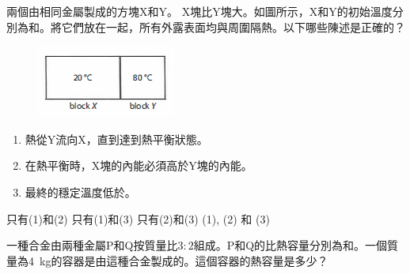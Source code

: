 {
    兩個由相同金屬製成的方塊X和Y。 X塊比Y塊大。如圖所示，X和Y的初始溫度分別為和。將它們放在一起，所有外露表面均與周圍隔熱。以下哪些陳述是正確的？
    \begin{figure}[h]
        \centering
        \includegraphics[width=0.35\linewidth]{assets/Screenshot 2023-08-29 143228.png}
    \end{figure}
    \begin{enumerate}[label=\sd]
        \item 熱從Y流向X，直到達到熱平衡狀態。
        \item 在熱平衡時，X塊的內能必須高於Y塊的內能。
        \item 最終的穩定溫度低於。
    \end{enumerate}
    \begin{choices}
        \choice 只有(1)和(2)
        \choice 只有(1)和(3)
        \choice 只有(2)和(3)
        \CorrectChoice (1), (2) 和 (3)
    \end{choices}
}{}

{
    一種合金由兩種金屬P和Q按質量比$3:2$組成。P和Q的比熱容量分別為和。一個質量為\qty{4}{kg}的容器是由這種合金製成的。這個容器的熱容量是多少？
    \begin{choices}
        \choice {}
        \choice {}
        \choice {}
        \CorrectChoice {}
    \end{choices}
}{}

